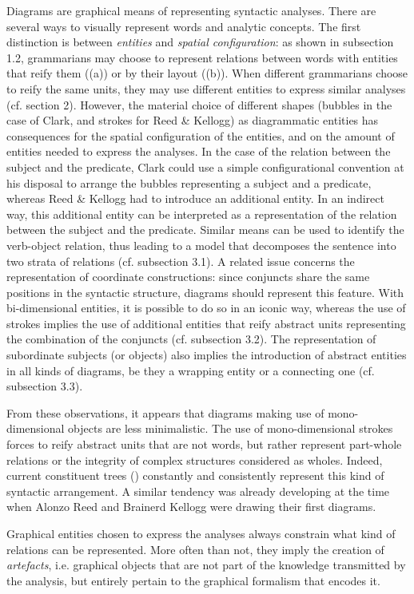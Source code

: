 \documentclass[output=paper]{langsci/langscibook}
\begin{document}
Diagrams are graphical means of representing syntactic analyses. There are several ways to visually represent words and analytic concepts. The first distinction is between \textit{entities} and \textit{spatial configuration}: as shown in subsection 1.2, grammarians may choose to represent relations between words with entities that reify them ((a)) or by their layout ((b)). When different grammarians choose to reify the same units, they may use different entities to express similar analyses (cf. section 2). However, the material choice of different shapes (bubbles in the case of Clark, and strokes for Reed \& Kellogg) as diagrammatic entities has consequences for the spatial configuration of the entities, and on the amount of entities needed to express the analyses. In the case of the relation between the subject and the predicate, Clark could use a simple configurational convention at his disposal to arrange the bubbles representing a subject and a predicate, whereas Reed \& Kellogg had to introduce an additional entity. In an indirect way, this additional entity can be interpreted as a representation of the relation between the subject and the predicate. Similar means can be used to identify the verb-object relation, thus leading to a model that decomposes the sentence into two strata of relations (cf. subsection 3.1). A related issue concerns the representation of coordinate constructions: since conjuncts share the same positions in the syntactic structure, diagrams should represent this feature. With bi-dimensional entities, it is possible to do so in an iconic way, whereas the use of strokes implies the use of additional entities that reify abstract units representing the combination of the conjuncts (cf. subsection 3.2). The representation of subordinate subjects (or objects) also implies the introduction of abstract entities in all kinds of diagrams, be they a wrapping entity or a connecting one (cf. subsection 3.3). 

From these observations, it appears that diagrams making use of mono-dimensional objects are less minimalistic. The use of mono-dimensional strokes forces to reify abstract units that are not words, but rather represent part-whole relations or the integrity of complex structures considered as wholes. Indeed, current constituent trees () constantly and consistently represent this kind of syntactic arrangement. A similar tendency was already developing at the time when Alonzo Reed and Brainerd Kellogg were drawing their first diagrams.

Graphical entities chosen to express the analyses always constrain what kind of relations can be represented. More often than not, they imply the creation of \textit{artefacts}, i.e. graphical objects that are not part of the knowledge transmitted by the analysis, but entirely pertain to the graphical formalism that encodes it.


{\sloppy\printbibliography[heading=subbibliography,notkeyword=this]}
\end{document}
